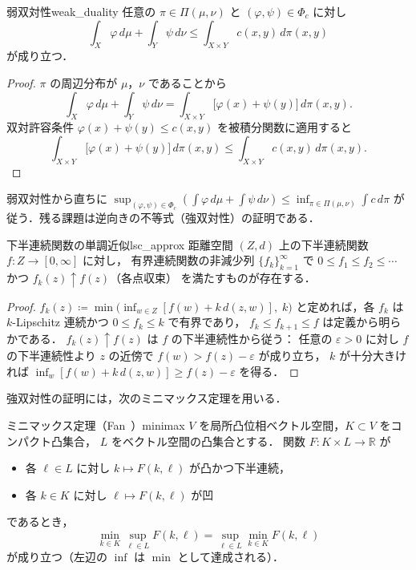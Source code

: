 \documentclass[uplatex, dvipdfmx]{jsarticle}
\begin{document}
\begin{proposition}{弱双対性}{weak_duality}
任意の $\pi\in\Pi(\mu,\nu)$ と $(\varphi,\psi)\in\Phi_c$ に対し
\[
  \int_X\varphi\,d\mu + \int_Y\psi\,d\nu
  \le \int_{X\times Y} c(x,y)\,d\pi(x,y)
\]
が成り立つ．
\end{proposition}

\begin{proof}
$\pi$ の周辺分布が $\mu$，$\nu$ であることから
\[
  \int_X\varphi\,d\mu + \int_Y\psi\,d\nu
  = \int_{X\times Y}\bigl[\varphi(x)+\psi(y)\bigr]\,d\pi(x,y).
\]
双対許容条件 $\varphi(x)+\psi(y)\le c(x,y)$ を被積分関数に適用すると
\[
  \int_{X\times Y}\bigl[\varphi(x)+\psi(y)\bigr]\,d\pi(x,y)
  \le \int_{X\times Y} c(x,y)\,d\pi(x,y).
\]
\end{proof}

弱双対性から直ちに
$\sup_{(\varphi,\psi)\in\Phi_c}(\int\varphi\,d\mu+\int\psi\,d\nu)
\le\inf_{\pi\in\Pi(\mu,\nu)}\int c\,d\pi$
が従う．残る課題は逆向きの不等式（強双対性）の証明である．

\begin{proposition}{下半連続関数の単調近似}{lsc_approx}
距離空間 $(Z,d)$ 上の下半連続関数 $f\colon Z\to[0,\infty]$ に対し，
有界連続関数の非減少列 $\{f_k\}_{k=1}^\infty$ で
$0\le f_1\le f_2\le\cdots$ かつ $f_k(z)\uparrow f(z)$（各点収束）
を満たすものが存在する．
\end{proposition}

\begin{proof}
$f_k(z)\coloneqq\min\bigl(\inf_{w\in Z}[f(w)+k\,d(z,w)],\;k\bigr)$
と定めれば，各 $f_k$ は $k$-Lipschitz 連続かつ $0\le f_k\le k$ で有界であり，
$f_k\le f_{k+1}\le f$ は定義から明らかである．
$f_k(z)\uparrow f(z)$ は $f$ の下半連続性から従う：
任意の $\varepsilon>0$ に対し $f$ の下半連続性より
$z$ の近傍で $f(w)>f(z)-\varepsilon$ が成り立ち，
$k$ が十分大きければ $\inf_w[f(w)+k\,d(z,w)]\ge f(z)-\varepsilon$ を得る．
\end{proof}

強双対性の証明には，次のミニマックス定理を用いる．

\begin{theorem}{ミニマックス定理（Fan~\cite{Fan1953}）}{minimax}
$V$ を局所凸位相ベクトル空間，$K\subset V$ をコンパクト凸集合，
$L$ をベクトル空間の凸集合とする．
関数 $F\colon K\times L\to\mathbb{R}$ が
\begin{itemize}
  \item 各 $\ell\in L$ に対し $k\mapsto F(k,\ell)$ が凸かつ下半連続，
  \item 各 $k\in K$ に対し $\ell\mapsto F(k,\ell)$ が凹
\end{itemize}
であるとき，
\[
  \min_{k\in K}\sup_{\ell\in L} F(k,\ell)
  = \sup_{\ell\in L}\min_{k\in K} F(k,\ell)
\]
が成り立つ（左辺の $\inf$ は $\min$ として達成される）．
\end{theorem}
\end{document}
